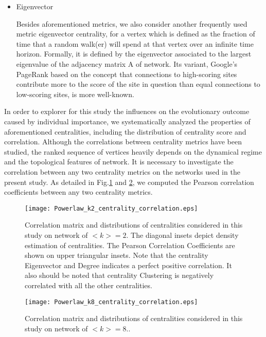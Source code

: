 \documentclass[preprint,12pt,3p]{elsarticle}
\begin{document}
\begin{itemize}
\item Eigenvector

Besides aforementioned metrics, we also consider another frequently used metric eigenvector centrality,
for a vertex which is defined as the fraction of time that a random walk(er) will spend at that vertex
over an infinite time horizon.
Formally, it is defined by the eigenvector associated to the largest eigenvalue
of the adjacency matrix A of network.
Its variant, Google's PageRank based on the concept that connections to high-scoring sites contribute
more to the score of the site in question than equal connections to low-scoring sites, is more well-known.

\end{itemize}


In order to explorer for this study the influences on the evolutionary outcome
caused by individual importance, we systematically analyzed the properties of aforementioned
centralities, including the distribution of centrality score and correlation.
Although the correlations between centrality metrics have been studied\cite{LiLi-18181,šikićLančić-17843},
the ranked sequence of vertices heavily depends on the dynamical regime and the topological features of network.
It is necessary to investigate the correlation between any two centrality metrics on
the networks used in the present study.
As detailed in Fig.\ref{fig corr centrality k=2} and \ref{fig corr centrality k=8}, we computed the Pearson correlation coefficients
between any two centrality metrics.

\begin{figure}
  \centering
  \texttt{[image: Powerlaw\_k2\_centrality\_correlation.eps]}
  \caption{Correlation matrix and distributions of centralities considered in this study on network of $<k>=2$.
  The diagonal insets depict density estimation of centralities.
  The Pearson Correlation Coefficients are shown on upper triangular insets.
  Note that the centrality Eigenvector and Degree indicates a perfect positive correlation.
  It also should be noted that centrality Clustering is negatively correlated with all the other centralities.
    }
  \label{fig corr centrality k=2}
\end{figure}

\begin{figure}
  \centering
  \texttt{[image: Powerlaw\_k8\_centrality\_correlation.eps]}
  \caption{Correlation matrix and distributions of centralities considered in this study on network of $<k>=8$..
  }
  \label{fig corr centrality k=8}
\end{figure}
\end{document}
